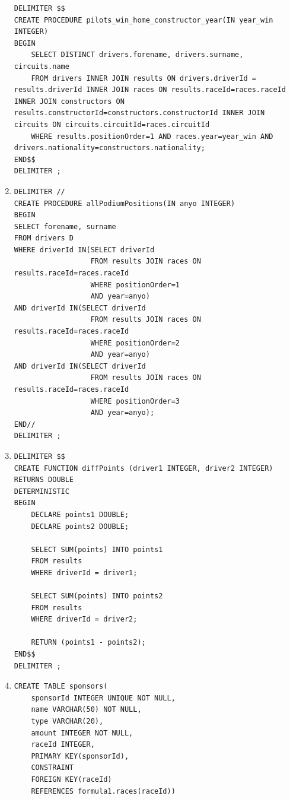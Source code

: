 \documentclass[a4paper]{article}
\begin{document}
\begin{enumerate}
\begin{verbatim}
DELIMITER $$
CREATE PROCEDURE pilots_win_home_constructor_year(IN year_win INTEGER)
BEGIN
    SELECT DISTINCT drivers.forename, drivers.surname, circuits.name
    FROM drivers INNER JOIN results ON drivers.driverId = results.driverId INNER JOIN races ON results.raceId=races.raceId INNER JOIN constructors ON results.constructorId=constructors.constructorId INNER JOIN circuits ON circuits.circuitId=races.circuitId 
    WHERE results.positionOrder=1 AND races.year=year_win AND drivers.nationality=constructors.nationality;
END$$
DELIMITER ;
    \end{verbatim}
    
    \item 
    \begin{verbatim}
DELIMITER //
CREATE PROCEDURE allPodiumPositions(IN anyo INTEGER)
BEGIN
SELECT forename, surname
FROM drivers D
WHERE driverId IN(SELECT driverId
                  FROM results JOIN races ON results.raceId=races.raceId
                  WHERE positionOrder=1
                  AND year=anyo)
AND driverId IN(SELECT driverId
                  FROM results JOIN races ON results.raceId=races.raceId
                  WHERE positionOrder=2
                  AND year=anyo)
AND driverId IN(SELECT driverId
                  FROM results JOIN races ON results.raceId=races.raceId
                  WHERE positionOrder=3
                  AND year=anyo);
END// 
DELIMITER ;    
    \end{verbatim}
    
    \item 
    \begin{verbatim}
DELIMITER $$
CREATE FUNCTION diffPoints (driver1 INTEGER, driver2 INTEGER)
RETURNS DOUBLE
DETERMINISTIC
BEGIN
    DECLARE points1 DOUBLE;
    DECLARE points2 DOUBLE;

    SELECT SUM(points) INTO points1
    FROM results
    WHERE driverId = driver1;
    
    SELECT SUM(points) INTO points2
    FROM results
    WHERE driverId = driver2;
          
    RETURN (points1 - points2);
END$$
DELIMITER ;    
    \end{verbatim}
    
    \item 
    \begin{verbatim}
CREATE TABLE sponsors(
    sponsorId INTEGER UNIQUE NOT NULL,
    name VARCHAR(50) NOT NULL,
    type VARCHAR(20),
    amount INTEGER NOT NULL,
    raceId INTEGER,
    PRIMARY KEY(sponsorId),
    CONSTRAINT
    FOREIGN KEY(raceId)
    REFERENCES formula1.races(raceId))


\end{verbatim}
\end{enumerate}
\end{document}
